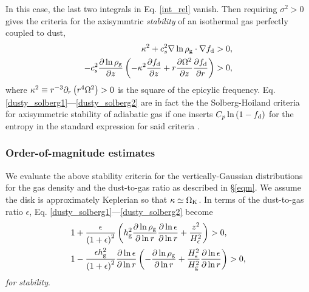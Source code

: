 In this case, the last two integrals in Eq. \ref{int_rel} vanish. Then 
requiring $\sigma^2>0$  gives the criteria 
for the axisymmtric \emph{stability} of an isothermal gas perfectly 
coupled to dust,  
\begin{align}
  \kappa^2 + c_s^2 \nabla\ln{\rho_\mathrm{g}}\cdot\nabla f_\mathrm{d} &> 0,\label{dusty_solberg1}  \\
  -c_s^2\frac{\partial\ln{\rho_\mathrm{g}}}{\partial z}\left(-\kappa^2\frac{\partial f_\mathrm{d}}{\partial
    z} + r\frac{\partial\Omega^2}{\partial z}\frac{\partial f_\mathrm{d}}{\partial r} \right) & > 0, \label{dusty_solberg2}
\end{align} 
where %
$\kappa^2 \equiv r^{-3}\partial_r\left(r^4\Omega^2\right)>0$ is the 
square of the epicylic frequency. %
Eq. \ref{dusty_solberg1}---\ref{dusty_solberg2} are in fact the 
the Solberg-Hoiland criteria for axisymmetric stability of adiabatic
gas if one inserts $C_p\ln{\left(1 -
    f_\mathrm{d}\right)}$ for the entropy in the standard
expression for said criteria \citep{tassoul78}.   


\subsubsection{Order-of-magnitude estimates} 
We evaluate the above stability criteria for the vertically-Gaussian
distributions for the gas density and the dust-to-gas ratio as 
described in \S\ref{eqm}. 
We assume the disk is approximately Keplerian so that
$\kappa\simeq\Omega_{\rm K}$. In terms of the dust-to-gas
ratio $\epsilon$, Eq. \ref{dusty_solberg1}---\ref{dusty_solberg2}
become   
\begin{align}
  &1 + \frac{\epsilon}{\left(1+
    \epsilon\right)^2}\left(h_\mathrm{g}^2\frac{\partial\ln{\rho_\mathrm{g}}}{\partial\ln{r}}
  \frac{\partial\ln{\epsilon}}{\partial\ln{r}} + 
  \frac{z^2}{H_\epsilon^2}\right)>0 \label{stability_est1},   \\ 
&1 - \frac{\epsilon
  h_\mathrm{g}^2}{\left(1+\epsilon\right)^2}
  \frac{\partial\ln{\epsilon}}{\partial\ln{r}}\left(-\frac{\partial\ln{\rho_\mathrm{g}}}{\partial\ln{r}}+\frac{H_\epsilon^2}{H_\mathrm{g}^2}\frac{\partial\ln{\epsilon}}{\partial\ln{r}}\right)
  > 0 \label{stability_est2},
\end{align}
\emph{for stability}. 

